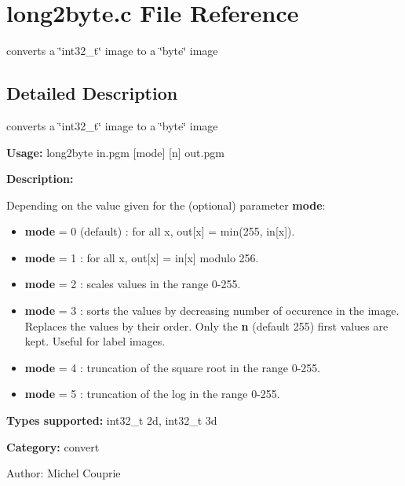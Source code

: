 \section{long2byte.c File Reference}
\label{long2byte_8c}
converts a \char`\"{}int32\_\-t\char`\"{} image to a \char`\"{}byte\char`\"{} image 



\subsection{Detailed Description}
converts a \char`\"{}int32\_\-t\char`\"{} image to a \char`\"{}byte\char`\"{} image 

{\bf Usage:} long2byte in.pgm [mode] [n] out.pgm

{\bf Description:}

Depending on the value given for the (optional) parameter {\bf mode}: \begin{itemize}
\item {\bf mode} = 0 (default) : for all x, out[x] = min(255, in[x]). \item {\bf mode} = 1 : for all x, out[x] = in[x] modulo 256. \item {\bf mode} = 2 : scales values in the range 0-255. \item {\bf mode} = 3 : sorts the values by decreasing number of occurence in the image. Replaces the values by their order. Only the {\bf n} (default 255) first values are kept. Useful for label images. \item {\bf mode} = 4 : truncation of the square root in the range 0-255. \item {\bf mode} = 5 : truncation of the log in the range 0-255.\end{itemize}
{\bf Types supported:} int32\_\-t 2d, int32\_\-t 3d

{\bf Category:} convert

\begin{Desc}
\item[Author:]Michel Couprie \end{Desc}
